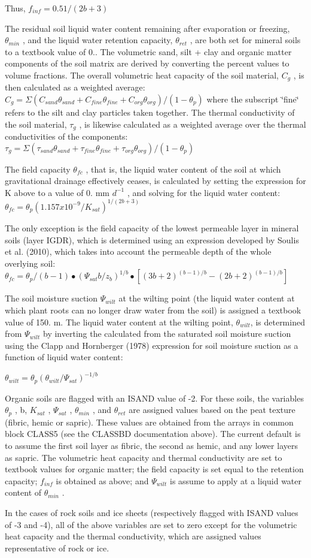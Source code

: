 Thus, $f_{inf} = 0.5 1/(2b+3)$

The residual soil liquid water content remaining after evaporation or freezing, $\theta_{min}$ , and the liquid water retention capacity, $\theta_{ret}$ , are both set for mineral soils to a textbook value of 0.. The volumetric sand, silt + clay and organic matter components of the soil matrix are derived by converting the percent values to volume fractions. The overall volumetric heat capacity of the soil material, $C_g$ , is then calculated as a weighted average\+: $C_g = \Sigma (C_{sand} \theta_{sand} + C_{fine} \theta_{fine} + C_{org} \theta_{org} )/(1 - \theta_p )$ where the subscript \char`\"{}fine\char`\"{} refers to the silt and clay particles taken together. The thermal conductivity of the soil material, $\tau_g$ , is likewise calculated as a weighted average over the thermal conductivities of the components\+: $\tau_g = \Sigma (\tau_{sand} \theta_{sand} + \tau_{fine} \theta_{fine} + \tau_{org} \theta_{org} )/(1 - \theta_p )$

The field capacity $\theta_{fc}$ , that is, the liquid water content of the soil at which gravitational drainage effectively ceases, is calculated by setting the expression for K above to a value of 0. mm $d^{-1}$ , and solving for the liquid water content\+: $\theta_{fc} = \theta_p (1.157 x 10^{-9} /K_{sat} )^{1/(2b + 3)}$

The only exception is the field capacity of the lowest permeable layer in mineral soils (layer I\+G\+D\+R), which is determined using an expression developed by Soulis et al. (2010), which takes into account the permeable depth of the whole overlying soil\+: $\theta_{fc} = \theta_p /(b-1) \bullet (\Psi_{sat} b/ z_b )^{1/b} \bullet [(3b+2)^{(b-1)/b} - (2b+2)^{(b-1)/b} ]$

The soil moisture suction $\Psi_{wilt}$ at the wilting point (the liquid water content at which plant roots can no longer draw water from the soil) is assigned a textbook value of 150. m. The liquid water content at the wilting point, $\theta_{wilt}$, is determined from $\Psi_{wilt}$ by inverting the calculated from the saturated soil moisture suction using the Clapp and Hornberger (1978) \cite{Clapp1978-898} expression for soil moisture suction as a function of liquid water content\+:

$\theta_{wilt} = \theta_p (\theta_{wilt} / \Psi_{sat} )^{-1/b} $

Organic soils are flagged with an I\+S\+A\+N\+D value of -\/2. For these soils, the variables $\theta_p$ , b, $K_{sat}$ , $\Psi_{sat}$ , $\theta_{min}$ , and $\theta_{ret}$ are assigned values based on the peat texture (fibric, hemic or sapric). These values are obtained from the arrays in common block C\+L\+A\+S\+S5 (see the C\+L\+A\+S\+S\+B\+D documentation above). The current default is to assume the first soil layer as fibric, the second as hemic, and any lower layers as sapric. The volumetric heat capacity and thermal conductivity are set to textbook values for organic matter; the field capacity is set equal to the retention capacity; $f_{inf}$ is obtained as above; and $\Psi_{wilt}$ is assume to apply at a liquid water content of $\theta_{min}$ .

In the cases of rock soils and ice sheets (respectively flagged with I\+S\+A\+N\+D values of -\/3 and -\/4), all of the above variables are set to zero except for the volumetric heat capacity and the thermal conductivity, which are assigned values representative of rock or ice.
